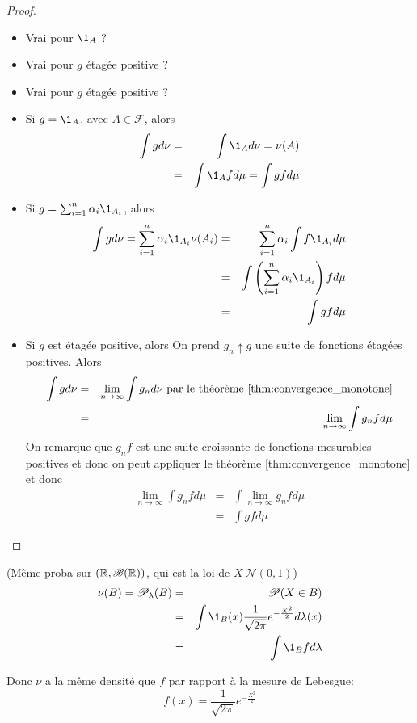 \begin{proof}
	\begin{itemize}
		\item Vrai pour $\1_A$ ?
		\item Vrai pour $g$ étagée positive ?
		\item Vrai pour  $g$ étagée positive ?
	\end{itemize}

	\begin{itemize}
		\item Si $g = \1_A$, avec $A \in \mathscr{F}$, alors
		      \begin{eqnarray*}
			      \int g d \nu &=& \int \1_A d\nu  = \nu(A) \\
			      &=& \int \1_A f d\mu = \int g f d\mu
		      \end{eqnarray*}
		\item Si $g = \sum_{i=1}^n \alpha_i \1_{A_i}$, alors
		      \begin{eqnarray*}
			      \int g d \nu = \sum_{i=1}^n \alpha_i \1_{A_i} \nu(A_i)  &=& \sum_{i=1}^n \alpha_i \int f \1_{A_i} d \mu \\
			      &=&\int \left(\sum_{i=1}^n \alpha_i \1_{A_i}\right) f d \mu \\
			      &=& \int g f d \mu
		      \end{eqnarray*}
		\item Si $g$ est étagée positive, alors
		      On prend $g_n \uparrow g$ une suite de fonctions étagées positives.
		      Alors \begin{eqnarray*}
			      \int g d \nu &=& \lim\limits_{n \to \infty} \int g_n d \nu  \text{ par le théorème \ref{thm:convergence_monotone}}\\
			      &=& \lim\limits_{n \to \infty} \int g_n f d \mu
		      \end{eqnarray*}
		      On remarque que $g_n f$ est une suite croissante de fonctions mesurables positives et donc
		      on peut appliquer le théorème \ref{thm:convergence_monotone} et donc
		      \begin{eqnarray*}
			      \lim\limits_{n \to \infty} \int g_n f d \mu & = & \int  \lim\limits_{n \to \infty} g_n f d \mu \\
			      &=& \int g f d \mu
		      \end{eqnarray*}
	\end{itemize}
\end{proof}

\begin{example}
	(Même proba sur  $(\mathbb{R}, \mathscr{B}(\mathbb{R}))$, qui est la loi de $X ~ \mathscr{N}(0,1)$)
	\begin{eqnarray*}
		\nu(B) = \Pro_\lambda(B) &= &\Pro(X \in B)  \\
		&=& \int \1_B(x) \frac{1}{\sqrt{2\pi}} e^{-\frac{X^2}{2}} d \lambda(x)\\
		&=&\int \1_B f d\lambda
	\end{eqnarray*}

	Donc $\nu$ a la même densité que $f$ par rapport à la mesure de Lebesgue:
	$$f (x) = \frac{1}{\sqrt{2\pi}} e^{-\frac{X^2}{2}} $$
\end{example}




